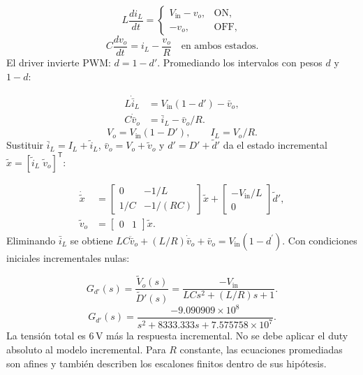 \documentclass[conference,letterpaper]{IEEEtran}
\begin{document}
\begin{equation}\label{eq:onoff}L\frac{di_L}{dt}=\begin{cases}V_{\mathrm{in}}-v_o,&\mathrm{ON},\\-v_o,&\mathrm{OFF},\end{cases}\end{equation}
\begin{equation}\label{eq:capacitor}C\frac{dv_o}{dt}=i_L-\frac{v_o}{R}\quad\text{en ambos estados}.\end{equation}
El driver invierte PWM: $d=1-d'$. Promediando los intervalos con pesos $d$ y $1-d$:

\begin{equation}\label{eq:average}\begin{aligned}L\dot{\bar i}_L&=V_{\mathrm{in}}(1-d')-\bar v_o,\\C\dot{\bar v}_o&=\bar i_L-\bar v_o/R.\end{aligned}\end{equation}
\begin{equation}\label{eq:equilibrium}V_o=V_{\mathrm{in}}(1-D'),\qquad I_L=V_o/R.\end{equation}
Sustituir $\bar i_L=I_L+\tilde i_L$, $\bar v_o=V_o+\tilde v_o$ y $d'=D'+\tilde d'$ da el estado incremental $\tilde x=[\tilde i_L\;\tilde v_o]^{\mathsf T}$:

\begin{equation}\label{eq:state}\begin{aligned}\dot{\tilde x}&=\begin{bmatrix}0&-1/L\\1/C&-1/(RC)\end{bmatrix}\tilde x+\begin{bmatrix}-V_{\mathrm{in}}/L\\0\end{bmatrix}\tilde d',\\\tilde v_o&=\begin{bmatrix}0&1\end{bmatrix}\tilde x.\end{aligned}\end{equation}
Eliminando $\bar i_L$ se obtiene $LC\ddot{\bar v}_o+(L/R)\dot{\bar v}_o+\bar v_o=V_{\mathrm{in}}(1-d^{\prime})$. Con condiciones iniciales incrementales nulas:

\begin{equation}\label{eq:plant}G_{d'}(s)=\frac{\widetilde V_o(s)}{\widetilde D'(s)}=\frac{-V_{\mathrm{in}}}{LCs^2+(L/R)s+1}.\end{equation}
\begin{equation}\label{eq:numeric}G_{d'}(s)=\frac{-9.090909\times10^8}{s^2+8333.333s+7.575758\times10^7}.\end{equation}
La tensión total es $6\,\mathrm{V}$ más la respuesta incremental. No se debe aplicar el duty absoluto al modelo incremental. Para $R$ constante, las ecuaciones promediadas son afines y también describen los escalones finitos dentro de sus hipótesis.
\end{document}
